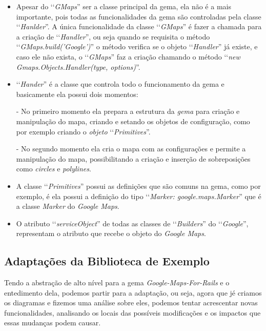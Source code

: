 \begin{itemize}

 \item Apesar do ‘‘\emph{GMaps}'' ser a classe principal da gema, ela não é a mais
 importante, pois todas as funcionalidades da gema são controladas pela classe
 ‘‘\emph{Hanlder}''. A única funcionalidade da classe ‘‘\emph{GMaps}'' é fazer a chamada
 para a criação de ‘‘\emph{Handler}'', ou seja quando se requisita o método 
 ‘‘\emph{GMaps.build('Google')}'' o método verifica se o objeto ‘‘\emph{Handler}'' já
 existe, e caso ele não exista, o ‘‘\emph{GMaps}'' faz a criação chamando o método 
 ‘‘\emph{new Gmaps.Objects.Handler(type, options)}''.

 \item ‘‘\emph{Hander}'' é a classe que controla todo o funcionamento da gema e 
 basicamente ela possui dois momentos:
 
  \subitem - No primeiro momento ela prepara a estrutura da \emph{gema} para criação e manipulação
  do mapa, criando e setando os objetos de configuração, como por exemplo criando o \emph{objeto}
  ‘‘\emph{Primitives}''.
  
  \subitem - No segundo momento ela cria o mapa com as configurações e permite a manipulação do mapa, 
  possibilitando a criação e inserção de sobreposições como \emph{circles} e \emph{polylines}.
 
 \item A classe ‘‘\emph{Primitives}'' possui as definições que são comuns na gema, 
 como por exemplo, é ela possui a definição do tipo ‘‘\emph{Marker: google.maps.Marker}'' que 
 é a classe \emph{Marker} do \emph{Google Maps}.
 
 \item O atributo ‘‘\emph{serviceObject}'' de todas as classes de 
 ‘‘\emph{Builders}'' do ‘‘\emph{Google}'', representam o atributo que recebe o objeto do 
 \emph{Google Maps}.
 
\end{itemize}


 \subsection{Adaptações da Biblioteca de Exemplo}
 \label{subsection:adaptações_da_biblioteca_de_exemplo}
 
 
Tendo a abstração de alto nível para a gema \emph{Google-Maps-For-Rails} e o entedimento dela, podemos
partir para a adaptação, ou seja, agora que jé criamos os diagramas e fizemos uma análise sobre eles,
podemos tentar acrescentar novas funcionalidades, analisando os locais das possíveis modificações e
os impactos que essas mudanças podem causar. 


